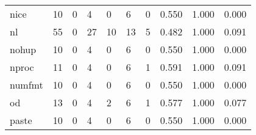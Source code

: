\begin{longtable}{lp{1.3cm}p{1.3cm}p{1.3cm}p{1.3cm}p{1.3cm}p{1.3cm}p{1.3cm}p{1.3cm}p{1.3cm}}
nice      &                     10 &                                             0 &                                            4 &                                           0 &                                            6 &                                          0 &                                0.550 &                                  1.000 &                                0.000 \\
nl        &                     55 &                                             0 &                                           27 &                                          10 &                                           13 &                                          5 &                                0.482 &                                  1.000 &                                0.091 \\
nohup     &                     10 &                                             0 &                                            4 &                                           0 &                                            6 &                                          0 &                                0.550 &                                  1.000 &                                0.000 \\
nproc     &                     11 &                                             0 &                                            4 &                                           0 &                                            6 &                                          1 &                                0.591 &                                  1.000 &                                0.091 \\
numfmt    &                     10 &                                             0 &                                            4 &                                           0 &                                            6 &                                          0 &                                0.550 &                                  1.000 &                                0.000 \\
od        &                     13 &                                             0 &                                            4 &                                           2 &                                            6 &                                          1 &                                0.577 &                                  1.000 &                                0.077 \\
paste     &                     10 &                                             0 &                                            4 &                                           0 &                                            6 &                                          0 &                                0.550 &                                  1.000 &                                0.000 \\

\end{longtable}
